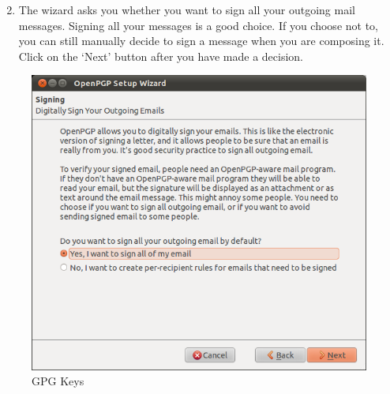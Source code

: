\begin{enumerate}[1.]
\setcounter{enumi}{1}
\item
  The wizard asks you whether you want to sign all your outgoing mail
  messages. Signing all your messages is a good choice. If you choose
  not to, you can still manually decide to sign a message when you are
  composing it. Click on the `Next' button after you have made a
  decision.
\end{enumerate}
\begin{figure}[htbp]
\centering
\includegraphics{gpg_keys_2.png}
\caption{GPG Keys}
\end{figure}

